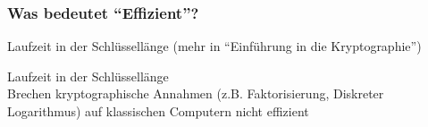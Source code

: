 \subsubsection*{Was bedeutet \enquote{Effizient}?}
\begin{minipage}{0.5\textwidth}
    \begin{defBox}
         Laufzeit  in der Schlüssellänge (mehr in \enquote{Einführung in die Kryptographie})
    \end{defBox}
\end{minipage}
\begin{minipage}{0.5\textwidth}
    \begin{defBox}
         Laufzeit  in der Schlüssellänge\\
        Brechen kryptographische Annahmen (z.B. Faktorisierung, Diskreter Logarithmus) auf klassischen Computern nicht effizient
    \end{defBox}
\end{minipage}

